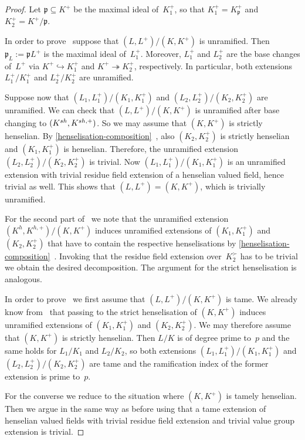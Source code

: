 \documentclass[10pt,a4paper]{amsart}
\newcommand{\fp}{{\mathfrak p}}
\newcommand{\sh}{{\rm sh}}   %
\begin{document}
\begin{proof}
    Let $\fp \subseteq K^+$ be the maximal ideal of~$K_1^+$, so that $K_1^+ = K^+_\fp$ and $K_2^+ = K^+/\fp$.
    
    In order to prove~ suppose that $(L,L^+)/(K,K^+)$ is unramified.
    Then $\fp_L := \fp L^+$ is the maximal ideal of~$L_1^+$.
    Moreover, $L_1^+$ and $L_2^+$ are the base changes of~$L^+$ via $K^+ \hookrightarrow K_1^+$ and $K^+ \twoheadrightarrow K_2^+$, respectively.
    In particular, both extensions $L_1^+/K_1^+$ and $L_2^+/K_2^+$ are unramified.
    
    Suppose now that $(L_1,L_1^+)/(K_1,K_1^+)$ and $(L_2,L_2^+)/(K_2,K_2^+)$ are unramified.
    We can check that $(L,L^+)/(K,K^+)$ is unramified after base changing to $(K^\sh,K^{\sh,+})$.
    So we may assume that $(K,K^+)$ is strictly henselian.
    By \cref{henselisation-composition}~, also $(K_2,K_2^+)$ is strictly henselian and $(K_1,K_1^+)$ is henselian.
    Therefore, the unramified extension $(L_2,L_2^+)/(K_2,K_2^+)$ is trivial.
    Now $(L_1,L_1^+)/(K_1,K_1^+)$ is an unramified extension with trivial residue field extension of a henselian valued field, hence trivial as well.
    This shows that $(L,L^+) = (K,K^+)$, which is trivially unramified.

    For the second part of~ we note that the unramified extension $(K^h,K^{h,+})/(K,K^+)$ induces unramified extensions of $(K_1,K_1^+)$ and $(K_2,K_2^+)$ that have to contain the respective henselisations by \cref{henselisation-composition}~.
    Invoking that the residue field extension over~$K_2^\succ$ has to be trivial we obtain the desired decomposition.
    The argument for the strict henselisation is analogous.

    In order to prove~ we first assume that $(L,L^+)/(K,K^+)$ is tame.
    We already know from~ that passing to the strict henselisation of $(K,K^+)$ induces unramified extensions of $(K_1,K_1^+)$ and $(K_2,K_2^+)$.
    We may therefore assume that $(K,K^+)$ is strictly henselian.
    Then $L/K$ is of degree prime to~$p$ and the same holds for $L_1/K_1$ and $L_2/K_2$, so both extensions $(L_1,L_1^+)/(K_1,K_1^+)$ and $(L_2,L_2^+)/(K_2,K_2^+)$ are tame and the ramification index of the former extension is prime to~$p$.
    
    For the converse we reduce to the situation where $(K,K^+)$ is tamely henselian.
    Then we argue in the same way as before using that a tame extension of henselian valued fields with trivial residue field extension and trivial value group extension is trivial.
\end{proof}
\end{document}
